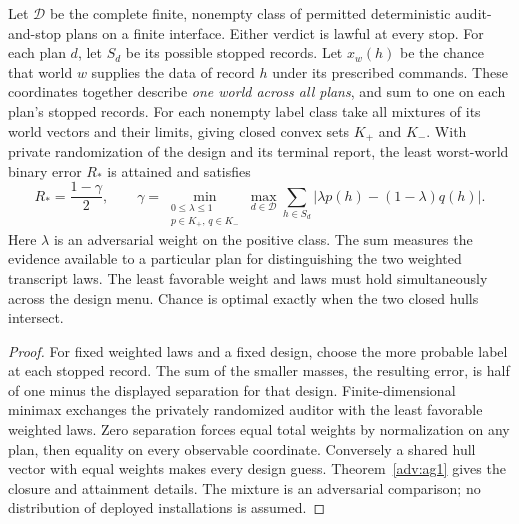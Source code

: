 \begin{theorem}\label{body:strategy}
Let \(\mathcal D\) be the complete finite, nonempty class of permitted deterministic audit-and-stop plans on a finite interface. Either verdict is lawful at every stop. For each plan \(d\), let \(S_d\) be its possible stopped records. Let \(x_w(h)\) be the chance that world \(w\) supplies the data of record \(h\) under its prescribed commands. These coordinates together describe \emph{one world across all plans}, and sum to one on each plan's stopped records. For each nonempty label class take all mixtures of its world vectors and their limits, giving closed convex sets \(K_+\) and \(K_-\). With private randomization of the design and its terminal report, the least worst-world binary error \(R_*\) is attained and satisfies
\[
 R_*=\frac{1-\gamma}{2},\qquad
 \gamma=\min_{\substack{0\le\lambda\le1\\ p\in K_+,\,q\in K_-}}
         \max_{d\in\mathcal D}\sum_{h\in S_d}
            \big|\lambda p(h)-(1-\lambda)q(h)\big|.
\]
Here \(\lambda\) is an adversarial weight on the positive class. The sum measures the evidence available to a particular plan for distinguishing the two weighted transcript laws. The least favorable weight and laws must hold simultaneously across the design menu. Chance is optimal exactly when the two closed hulls intersect.
\end{theorem}
\begin{proof}
For fixed weighted laws and a fixed design, choose the more probable label at each stopped record. The sum of the smaller masses, the resulting error, is half of one minus the displayed separation for that design. Finite-dimensional minimax exchanges the privately randomized auditor with the least favorable weighted laws. Zero separation forces equal total weights by normalization on any plan, then equality on every observable coordinate. Conversely a shared hull vector with equal weights makes every design guess. Theorem~\ref{adv:ag1} gives the closure and attainment details. The mixture is an adversarial comparison; no distribution of deployed installations is assumed.
\end{proof}

